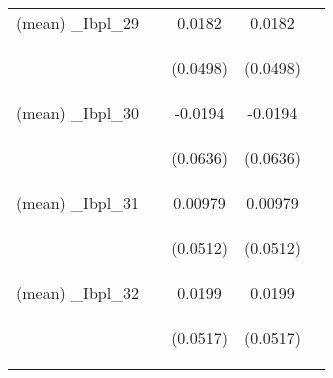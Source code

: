 \documentclass[]{article}
\begin{document}
\begin{center}
\begin{tabular}{lcccc}
(mean) \_Ibpl\_29 &  & 0.0182 & 0.0182 &  \\
\vspace{4pt} & \begin{footnotesize}\end{footnotesize} & \begin{footnotesize}(0.0498)\end{footnotesize} & \begin{footnotesize}(0.0498)\end{footnotesize} & \begin{footnotesize}\end{footnotesize} \\
(mean) \_Ibpl\_30 &  & -0.0194 & -0.0194 &  \\
\vspace{4pt} & \begin{footnotesize}\end{footnotesize} & \begin{footnotesize}(0.0636)\end{footnotesize} & \begin{footnotesize}(0.0636)\end{footnotesize} & \begin{footnotesize}\end{footnotesize} \\
(mean) \_Ibpl\_31 &  & 0.00979 & 0.00979 &  \\
\vspace{4pt} & \begin{footnotesize}\end{footnotesize} & \begin{footnotesize}(0.0512)\end{footnotesize} & \begin{footnotesize}(0.0512)\end{footnotesize} & \begin{footnotesize}\end{footnotesize} \\
(mean) \_Ibpl\_32 &  & 0.0199 & 0.0199 &  \\
\vspace{4pt} & \begin{footnotesize}\end{footnotesize} & \begin{footnotesize}(0.0517)\end{footnotesize} & \begin{footnotesize}(0.0517)\end{footnotesize} & \begin{footnotesize}\end{footnotesize} \\

\end{tabular}
\end{center}
\end{document}
